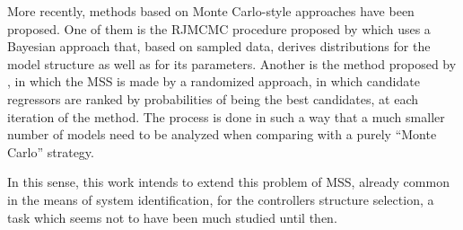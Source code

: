 	More recently, methods based on Monte Carlo-style approaches have been proposed.
	One of them is the RJMCMC procedure proposed by \cite{baldacchino2013} which uses a Bayesian approach that, based on sampled data, derives distributions for the model structure as well as for its parameters.
	Another is the method proposed by \citep{falsone2014, falsone2015}, in which the MSS is made by a randomized approach, in which candidate regressors are ranked by probabilities of being the best candidates, at each iteration of the method.
	The process is done in such a way that a much smaller number of models need to be analyzed when comparing with a purely  ``Monte Carlo'' strategy.

	In this sense, this work intends to extend this problem of MSS, already common in the means of system identification, for the controllers structure selection, a task which seems not to have been much studied until then.
	
